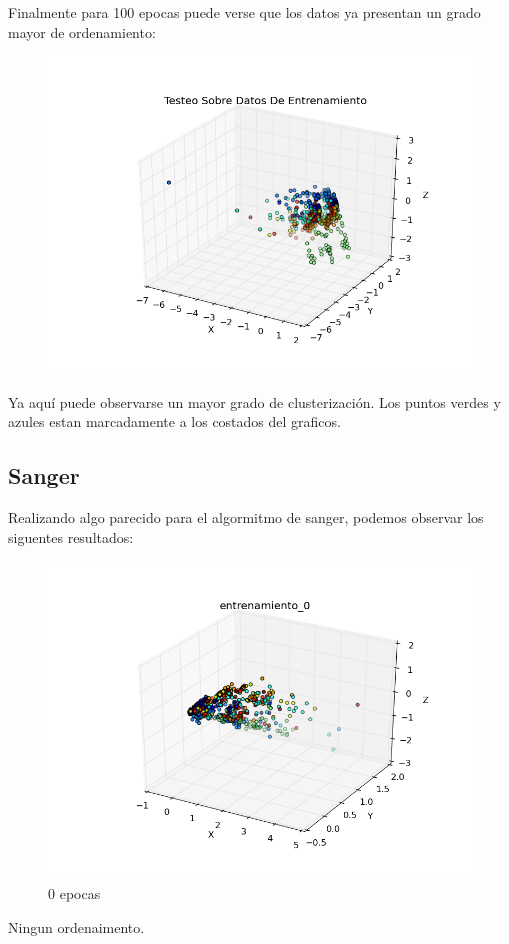 Finalmente para 100 epocas puede verse que los datos ya presentan un grado mayor de ordenamiento:

\begin{figure}[h!]
	\centering
	\includegraphics[width=.6\linewidth]{convergencia_oja/entrenamiento_100.png}
	\label{fig:test1}
	\centering
\end{figure}

Ya aquí puede observarse un mayor grado de clusterización. Los puntos verdes y azules estan marcadamente a los costados del graficos.

\pagebreak

\subsection{Sanger}

Realizando algo parecido para el algormitmo de sanger, podemos observar los siguentes resultados:

\begin{figure}[h!]
  \centering
  \includegraphics[width=.6\linewidth]{convergencia_sanger/entrenamiento_0.png}
\caption{0 epocas}
\label{fig:test}
\end{figure}

Ningun ordenaimento.

